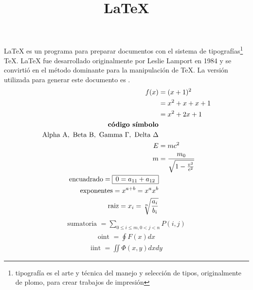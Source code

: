 \documentclass[10pt]{article}
\title{\LaTeX}
\date{}
\begin{document}
\LaTeX{} es un programa para preparar documentos con  el sistema de
tipograf\'ias\footnote{%
tipograf\'ia es el arte y t\'ecnica del manejo y selecci\'on de tipos, 
originalmente de plomo, para crear trabajos de impresi\'on } %
\TeX{}. \LaTeX{} fue desarrollado originalmente por Leslie Lamport en 
1984 y se convirti\'o en el m\'etodo dominante para la  manipulaci\'on 
de \TeX. La versi\'on utilizada para generar  este documento es \LaTeXe.
\newline
\begin{align*}
f(x) &= (x+1)^2 \\
&= x^2 + x + x + 1 \\
&= x^2 + 2x + 1 \\
\textbf{código } \textbf{símbolo}\\
\text{Alpha } \mathrm{A}, \text{ Beta } \mathrm{B}, \text{ Gamma } \Gamma, \text{ Delta } \Delta\\
E &= mc^2                              \\
m &= \frac{m_0}{\sqrt{1-\frac{v^2}{c^2}}} \\
\text{encuadrado} = \begin{array}{|c|} \hline 0=a_{11} + a_{12}\\ \hline \end{array}\\
\text{exponentes} = x^{a+b}=x^ax^b \\
\text{raiz} = x_i=\sqrt[n]{\frac{a_i}{b_i}}
\end{align*}
\begin{align*}
\text{sumatoria } = \sum_{0\le i\le m, 0<j<n}P(i, j) 
\end{align*}
\begin{align*}
\text{oint } = \oint F(x)dx 
\end{align*}
\begin{align*}
\text{iint } = \iint \Phi(x, y)dxdy 
\end{align*}
\end{document}
